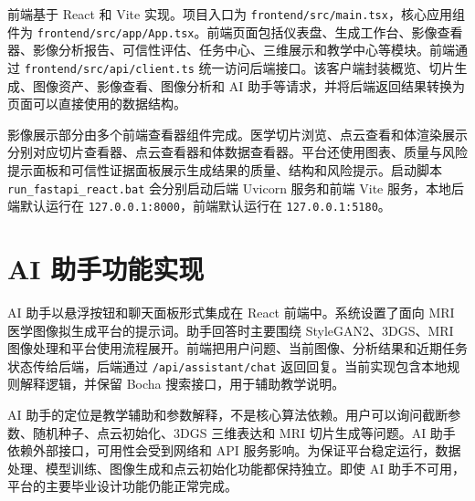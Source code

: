 前端基于 React 和 Vite 实现。项目入口为 \texttt{frontend/src/main.tsx}，核心应用组件为 \texttt{frontend/src/app/App.tsx}。前端页面包括仪表盘、生成工作台、影像查看器、影像分析报告、可信性评估、任务中心、三维展示和教学中心等模块。前端通过 \texttt{frontend/src/api/client.ts} 统一访问后端接口。该客户端封装概览、切片生成、图像资产、影像查看、图像分析和 AI 助手等请求，并将后端返回结果转换为页面可以直接使用的数据结构。

影像展示部分由多个前端查看器组件完成。医学切片浏览、点云查看和体渲染展示分别对应切片查看器、点云查看器和体数据查看器。平台还使用图表、质量与风险提示面板和可信性证据面板展示生成结果的质量、结构和风险提示。启动脚本 \texttt{run\_fastapi\_react.bat} 会分别启动后端 Uvicorn 服务和前端 Vite 服务，本地后端默认运行在 \texttt{127.0.0.1:8000}，前端默认运行在 \texttt{127.0.0.1:5180}。

\section{AI 助手功能实现}
AI 助手以悬浮按钮和聊天面板形式集成在 React 前端中。系统设置了面向 MRI 医学图像拟生成平台的提示词。助手回答时主要围绕 StyleGAN2、3DGS、MRI 图像处理和平台使用流程展开。前端把用户问题、当前图像、分析结果和近期任务状态传给后端，后端通过 \texttt{/api/assistant/chat} 返回回复。当前实现包含本地规则解释逻辑，并保留 Bocha 搜索接口，用于辅助教学说明。

AI 助手的定位是教学辅助和参数解释，不是核心算法依赖。用户可以询问截断参数、随机种子、点云初始化、3DGS 三维表达和 MRI 切片生成等问题。AI 助手依赖外部接口，可用性会受到网络和 API 服务影响。为保证平台稳定运行，数据处理、模型训练、图像生成和点云初始化功能都保持独立。即使 AI 助手不可用，平台的主要毕业设计功能仍能正常完成。
